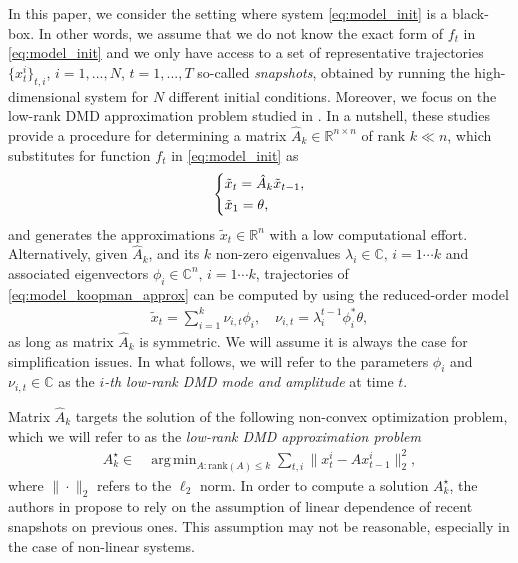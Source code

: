 \documentclass{article}
\newcommand{\Rr}{\mathds{R}}
\newcommand{\Cr}{\mathds{C}}
\newcommand{\Sc}{\mathcal{S}}
\newcommand{\Tc}{\mathcal{T}}
\DeclareMathOperator*{\argmin}{arg\,min}
\def\remCH#1{{\noindent\color{red}{{\footnotesize [CH: #1]}}}}
\begin{document}
In this paper, we  consider the setting where  system \eqref{eq:model_init} is a black-box. In other words, we assume that  we do not know the exact form of $f_t$ in \eqref{eq:model_init} and we only have access to a set of representative trajectories $\{x^i_t\}_{t,i}$, $i=1,...,N$, $t=1,...,T$ so-called \textit{snapshots}, obtained by running the high-dimensional system for $N$ different initial conditions.   
Moreover, we focus on the low-rank DMD approximation problem studied  in \cite{Chen12,Jovanovic12}.  In a nutshell, these studies provide a procedure for determining  a matrix $ \hat A_k{\in\Rr^{n\times n}}$ of rank $k \ll n$, which substitutes {for} function $f_t$ in \eqref{eq:model_init} {as}
\begin{align}\label{eq:model_koopman_approx} 
 \left\{\begin{aligned}
& \tilde x_{t}=  \hat A_k \tilde  x_{t-1} , \\%
&\tilde x_1={\theta},
\end{aligned}\right. \vspace{-0.cm}%
\end{align} 
and generates the approximations $\tilde x_{t}\in \Rr^n$ with a low computational effort.  Alternatively, given  $\hat A_k$, and its  $k$ non-zero eigenvalues $\lambda_i \in \Cr,\, i=1 \cdots k$  and associated eigenvectors $\phi_i \in \Cr^n,\, i=1 \cdots k$,  trajectories of  \eqref{eq:model_koopman_approx} can be computed by using the reduced-order model   %
\begin{align}
\tilde x_{t}=\sum_{i=1}^k \nu_{i,t} \phi_i,\label{eq:koopman1}\quad \nu_{i,t} =  \lambda_i^{t-1} \phi_i^*\theta,
\end{align} 
as long as matrix $\hat A_k$ is symmetric. We will assume it is always the case for simplification issues.
In what follows, we will  refer to the parameters  $\phi_i$ and $\nu_{i,t}\in \Cr$  as  the  \textit{$i$-th low-rank DMD mode and amplitude} at time $t$. 

Matrix $\hat A_k$ targets the solution of the following non-convex optimization problem, which we will refer to as the {\it low-rank DMD approximation problem}
\begin{align}\label{eq:prob} 
A_k^\star \in &\argmin_{A:\textrm{rank}(A)\le k}  \sum_{t,i} \| x^i_{t} - A   x^i_{t-1}\|^2_2, %
\end{align} 
where $\|\cdot\|_2$ refers to the $\ell_2$ norm.  
In order to compute {a} solution $A_k^\star$, the authors in \cite{Chen12,Jovanovic12} propose to rely on the  assumption  of linear dependence of recent snapshots on previous ones. This assumption may  not be reasonable, especially  in the case of non-linear systems.  
\end{document}
